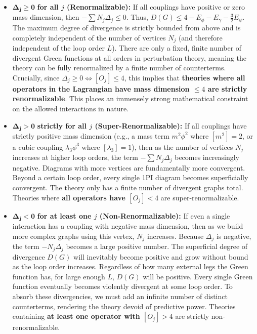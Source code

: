\begin{itemize}
    \item $\mathbf{\Delta_j \geq 0}$ \textbf{for all $j$ (Renormalizable):}
          If all couplings have positive or zero mass dimension, then $-\sum N_j \Delta_j \leq 0$. Thus, $D(G) \leq 4 - E_\phi - E_\gamma - \frac{3}{2}E_\psi$. The maximum degree of divergence is strictly bounded from above and is completely independent of the number of vertices $N_j$ (and therefore independent of the loop order $L$). There are only a fixed, finite number of divergent Green functions at all orders in perturbation theory, meaning the theory can be fully renormalized by a finite number of counterterms.
          Crucially, since $\Delta_j \geq 0 \iff [O_j] \leq 4$, this implies that \textbf{theories where all operators in the Lagrangian have mass dimension $\leq 4$ are strictly renormalizable}. This places an immensely strong mathematical constraint on the allowed interactions in nature.

    \item $\mathbf{\Delta_j > 0}$ \textbf{strictly for all $j$ (Super-Renormalizable):}
          If all couplings have strictly positive mass dimension (e.g., a mass term $m^2\phi^2$ where $[m^2]=2$, or a cubic coupling $\lambda_3\phi^3$ where $[\lambda_3]=1$), then as the number of vertices $N_j$ increases at higher loop orders, the term $-\sum N_j \Delta_j$ becomes increasingly negative. Diagrams with more vertices are fundamentally more convergent. Beyond a certain loop order, every single 1PI diagram becomes superficially convergent. The theory only has a finite number of divergent graphs total. Theories where \textbf{all operators have $[O_j] < 4$} are super-renormalizable.

    \item $\mathbf{\Delta_j < 0}$ \textbf{for at least one $j$ (Non-Renormalizable):}
          If even a single interaction has a coupling with negative mass dimension, then as we build more complex graphs using this vertex, $N_j$ increases. Because $\Delta_j$ is negative, the term $-N_j \Delta_j$ becomes a large positive number. The superficial degree of divergence $D(G)$ will inevitably become positive and grow without bound as the loop order increases. Regardless of how many external legs the Green function has, for large enough $L$, $D(G)$ will be positive. Every single Green function eventually becomes violently divergent at some loop order. To absorb these divergencies, we must add an infinite number of distinct counterterms, rendering the theory devoid of predictive power. Theories containing \textbf{at least one operator with $[O_j] > 4$} are strictly non-renormalizable.
\end{itemize}

